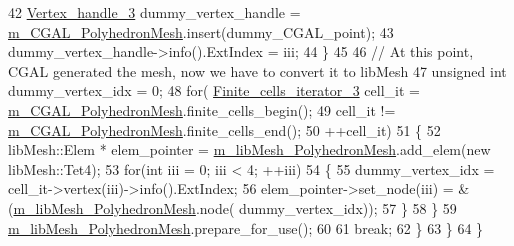 \begin{DoxyCode}
42             \hyperlink{_c_g_a_l__typedefs_8h_a3b04696a797c3efc6eb818ce4e95b906}{Vertex\_handle\_3} dummy\_vertex\_handle = 
      \hyperlink{classcarl_1_1_mesh___intersection_a256506b058cda4c9b767d14277b9650c}{m\_CGAL\_PolyhedronMesh}.insert(dummy\_CGAL\_point);
43             dummy\_vertex\_handle->info().ExtIndex = iii;
44         \}
45 
46         \textcolor{comment}{// At this point, CGAL generated the mesh, now we have to convert it to libMesh}
47         \textcolor{keywordtype}{unsigned} \textcolor{keywordtype}{int} dummy\_vertex\_idx = 0;
48         \textcolor{keywordflow}{for}(    \hyperlink{_c_g_a_l__typedefs_8h_a566d5fb492ed5802eb53bc2f2e0be9d5}{Finite\_cells\_iterator\_3} cell\_it = 
      \hyperlink{classcarl_1_1_mesh___intersection_a256506b058cda4c9b767d14277b9650c}{m\_CGAL\_PolyhedronMesh}.finite\_cells\_begin();
49                 cell\_it != \hyperlink{classcarl_1_1_mesh___intersection_a256506b058cda4c9b767d14277b9650c}{m\_CGAL\_PolyhedronMesh}.finite\_cells\_end();
50                 ++cell\_it)
51         \{
52             libMesh::Elem * elem\_pointer =  \hyperlink{classcarl_1_1_mesh___intersection_a4377fd67cf7c486ba4263fe11b99a3cf}{m\_libMesh\_PolyhedronMesh}.add\_elem(\textcolor{keyword}{new} 
      libMesh::Tet4);
53             \textcolor{keywordflow}{for}(\textcolor{keywordtype}{int} iii = 0; iii < 4; ++iii)
54             \{
55                 dummy\_vertex\_idx = cell\_it->vertex(iii)->info().ExtIndex;
56                 elem\_pointer->set\_node(iii) = &(\hyperlink{classcarl_1_1_mesh___intersection_a4377fd67cf7c486ba4263fe11b99a3cf}{m\_libMesh\_PolyhedronMesh}.node(
      dummy\_vertex\_idx));
57             \}
58         \}
59         \hyperlink{classcarl_1_1_mesh___intersection_a4377fd67cf7c486ba4263fe11b99a3cf}{m\_libMesh\_PolyhedronMesh}.prepare\_for\_use();
60 
61         \textcolor{keywordflow}{break};
62     \}
63     \}
64 \}
\end{DoxyCode}
\hypertarget{classcarl_1_1_mesh___intersection_a86537a2c060ef77c8f9d20f8c5bd6c40}{}
